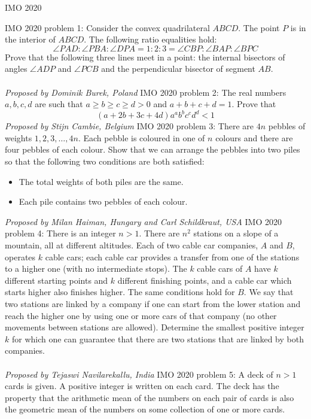 IMO 2020 

IMO 2020 problem 1:  Consider the convex quadrilateral $ABCD$. The point $P$ is in the interior of $ABCD$. The following ratio equalities hold:
\[ \angle PAD:\angle PBA:\angle DPA=1:2:3=\angle CBP:\angle BAP:\angle BPC \]
Prove that the following three lines meet in a point: the internal bisectors of angles $\angle ADP$ and $\angle PCB$ and the perpendicular bisector of segment $AB$. \\\\
\textit{Proposed by Dominik Burek, Poland} 
IMO 2020 problem 2:  The real numbers $a, b, c, d$ are such that $a\geq b\geq c\geq d>0$ and $a+b+c+d=1$. Prove that
\[ (a+2b+3c+4d)a^ab^bc^cd^d<1 \]
\textit{Proposed by Stijn Cambie, Belgium} 
IMO 2020 problem 3:  There are $4n$ pebbles of weights $1, 2, 3, \dots, 4n.$ Each pebble is coloured in one of $n$ colours and there are four pebbles of each colour. Show that we can arrange the pebbles into two piles so that the following two conditions are both satisfied:
\begin{itemize}
  \item The total weights of both piles are the same.
  \item Each pile contains two pebbles of each colour.
\end{itemize}
\textit{Proposed by Milan Haiman, Hungary and Carl Schildkraut, USA} 
IMO 2020 problem 4:  There is an integer $n > 1$. There are $n^2$ stations on a slope of a mountain, all at different altitudes. Each of two cable car companies, $A$ and $B$, operates $k$ cable cars; each cable car provides a transfer from one of the stations to a higher one (with no intermediate stops). The $k$ cable cars of $A$ have $k$ different starting points and $k$ different finishing points, and a cable car which starts higher also finishes higher. The same conditions hold for $B$. We say that two stations are linked by a company if one can start from the lower station and reach the higher one by using one or more cars of that company (no other movements between stations are allowed). Determine the smallest positive integer $k$ for which one can guarantee that there are two stations that are linked by both companies. \\\\
\textit{Proposed by Tejaswi Navilarekallu, India} 
IMO 2020 problem 5:  A deck of $n > 1$ cards is given. A positive integer is written on each card. The deck has the property that the arithmetic mean of the numbers on each pair of cards is also the geometric mean of the numbers on some collection of one or more cards. \\
